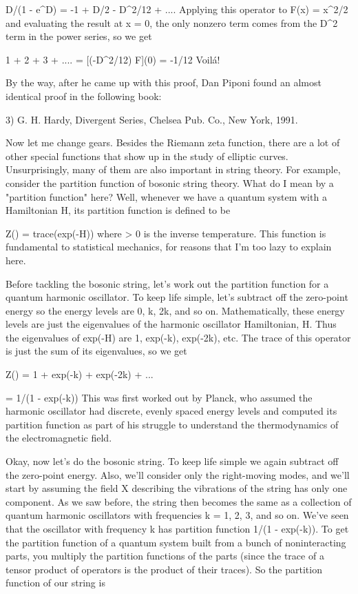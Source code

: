                   D/(1 - e^{D}) = -1 + D/2 - D^{2}/12 + ....
Applying this operator to F(x) = x^{2}/2 and evaluating the result at 
x = 0, the only nonzero term comes from the D^{2} term in the power 
series, so we get 

                1 + 2 + 3 + .... = [(-D^{2}/12) F](0) = -1/12
Voil\'{a}!  

By the way, after he came up with this proof, Dan Piponi found an
almost identical proof in the following book:

3) G. H. Hardy, Divergent Series, Chelsea Pub. Co., New York, 1991.

Now let me change gears.  Besides the Riemann zeta function, there are a
lot of other special functions that show up in the study of elliptic
curves.  Unsurprisingly, many of them are also important in string
theory.  For example, consider the partition function of bosonic string
theory.  What do I mean by a "partition function" here?  Well, whenever
we have a quantum system with a Hamiltonian H, its partition function is
defined to be

                         Z(\beta ) = trace(exp(-\beta H))
where \beta  > 0 is the inverse temperature.  This function is fundamental to
statistical mechanics, for reasons that I'm too lazy to explain here.

Before tackling the bosonic string, let's work out the partition function
for a quantum harmonic oscillator.  To keep life simple, let's subtract
off the zero-point energy so the energy levels are 0, k, 2k, and so on.
Mathematically, these energy levels are just the eigenvalues of the
harmonic oscillator Hamiltonian, H.  Thus the eigenvalues of exp(-\beta H)
are 1, exp(-\beta k), exp(-2\beta k), etc.  The trace of this operator is just 
the sum of its eigenvalues, so we get

           Z(\beta ) = 1 + exp(-\beta k) + exp(-2\beta k) + ...
       
                = 1/(1 - exp(-\beta k))
This was first worked out by Planck, who assumed the harmonic oscillator
had discrete, evenly spaced energy levels and computed its partition
function as part of his struggle to understand the thermodynamics of
the electromagnetic field.

Okay, now let's do the bosonic string.  To keep life simple we again
subtract off the zero-point energy.  Also, we'll consider only the
right-moving modes, and we'll start by assuming the field X describing
the vibrations of the string has only one component.  As we saw before,
the string then becomes the same as a collection of quantum harmonic
oscillators with frequencies k = 1, 2, 3, and so on.  We've seen that
the oscillator with frequency k has partition function 1/(1 - exp(-\beta k)).
To get the partition function of a quantum system built from a bunch of
noninteracting parts, you  multiply the partition functions of the parts
(since the trace of a tensor product of operators is the product of their 
traces).  So the partition function of our string is 
                
